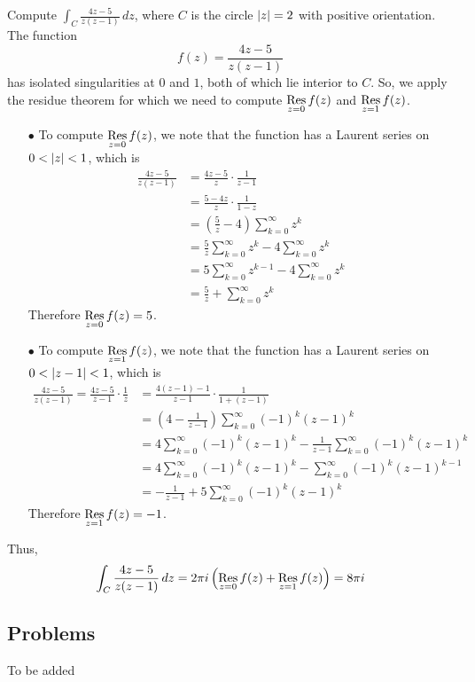 \vspace*{1em}

\begin{example}\label{resexample}
Compute $\displaystyle \int_C\frac{4z - 5}{z(z - 1)}\,dz$, where $C$ is the circle $\left\lvert z\right\rvert = 2$ with positive orientation. The function
\[f(z) = \frac{4z - 5}{z(z - 1)}\]
has isolated singularities at $0$ and $1$, both of which lie interior to $C$. So, we apply the residue theorem for which we need to compute $\underset{z = {0}}{\operatorname{Res}}\,f(z)$ and $\underset{z = {1}}{\operatorname{Res}}\,f(z)$.
\begin{itemize}[itemsep=0.5em]
\item[$\bullet$] To compute $\underset{z = {0}}{\operatorname{Res}}\,f(z)$, we note that the function has a Laurent series on $0 < \left\lvert z\right\rvert < 1$, which is
\begin{align*}
\frac{4z - 5}{z(z - 1)} &= \frac{4z - 5}{z}\cdot\frac{1}{z - 1}\\[0.5em]
 &= \frac{5 - 4z}{z}\cdot\frac{1}{1 - z}\\[0.5em]
 &= \left(\frac{5}{z} - 4\right)\sum_{k=0}^\infty z^k\\[0.5em]
 &= \frac{5}{z}\sum_{k=0}^\infty z^k - 4\sum_{k=0}^\infty z^k\\[0.5em]
 &= 5\sum_{k=0}^\infty z^{k-1} - 4\sum_{k=0}^\infty z^k\\[0.5em]
 &= \frac{5}{z} + \sum_{k=0}^\infty z^k
\end{align*}
Therefore $\underset{z = {0}}{\operatorname{Res}}\,f(z) = 5$.
\item[$\bullet$] To compute $\underset{z = {1}}{\operatorname{Res}}\,f(z)$, we note that the function has a Laurent series on $0 < \left\lvert z - 1\right\rvert < 1$, which is
\begin{align*}
\frac{4z - 5}{z(z - 1)} = \frac{4z - 5}{z - 1}\cdot\frac{1}{z} &= \frac{4(z - 1) - 1}{z - 1}\cdot\frac{1}{1 + (z - 1)}\\[0.5em]
 &= \left(4 - \frac{1}{z - 1}\right)\sum_{k=0}^\infty (-1)^k (z-1)^k\\[0.5em]
 &= 4\sum_{k=0}^\infty (-1)^k(z-1)^k - \frac{1}{z - 1}\sum_{k=0}^\infty (-1)^k(z - 1)^k\\[0.5em]
 &= 4\sum_{k=0}^\infty (-1)^k(z-1)^k - \sum_{k=0}^\infty (-1)^k(z - 1)^{k-1}\\[0.5em]
 &= -\frac{1}{z - 1} + 5\sum_{k=0}^\infty(-1)^k(z-1)^k
\end{align*}
Therefore $\underset{z = {1}}{\operatorname{Res}}\,f(z) = -1$.
\end{itemize}
Thus,
\[\int_C\frac{4z - 5}{z(z - 1)}\,dz = 2\pi i\left(\underset{z = {0}}{\operatorname{Res}}\,f(z) + \underset{z = {1}}{\operatorname{Res}}\,f(z)\right) = 8\pi i\]
\end{example}

\vspace*{2em}

\subsection{Problems}
\vspace{0.1in}
To be added
%
